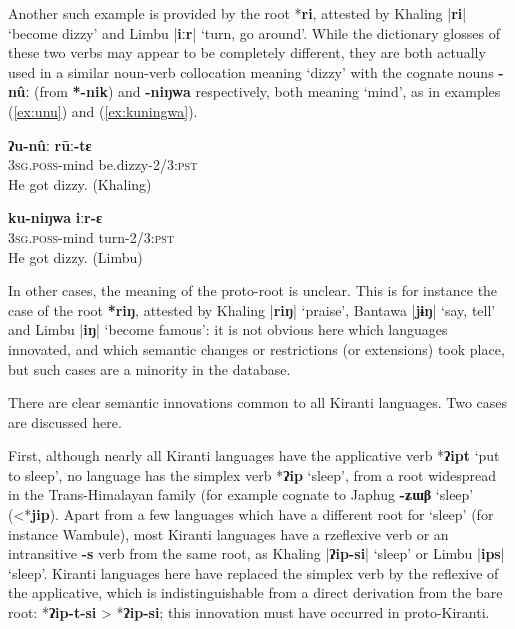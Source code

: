 \documentclass[oneside,a4paper,11pt]{article}
\newcommand{\ipa}[1]{\textbf{{\phon\mbox{#1}}}} %
\newcommand{\dhatu}[2]{|\ipa{#1}| `#2'}
\begin{document}
Another such example is provided by the root *\ipa{ri}, attested by Khaling \dhatu{ri}{become dizzy} and Limbu \dhatu{iːr}{turn, go around}. While the dictionary glosses of these two verbs may appear to be completely different, they are both actually used in a similar noun-verb collocation meaning `dizzy' with the cognate nouns \ipa{-nûː} (from \ipa{*-nik}) and \ipa{-niŋwa} respectively, both meaning `mind', as in examples (\ref{ex:unu}) and (\ref{ex:kuningwa}).

\begin{exe}
\ex \label{ex:unu}
\gll \ipa{ʔu-nûː} \ipa{rūː-tɛ} \\
\textsc{3sg.poss}-mind be.dizzy-\textsc{2/3:pst} \\
\glt He got dizzy. (Khaling)
\end{exe}


\begin{exe}
\ex \label{ex:kuningwa}
\gll \ipa{ku-niŋwa} \ipa{iːr-ɛ} \\
\textsc{3sg.poss}-mind turn-\textsc{2/3:pst} \\
\glt He got dizzy. (Limbu)
\end{exe}



In other cases, the meaning of the proto-root is unclear. This is for instance the case of the root \ipa{*riŋ}, attested by Khaling \dhatu{riŋ}{praise}, Bantawa \dhatu{jɨŋ}{say, tell} and Limbu \dhatu{iŋ}{become famous}: it is not obvious here which languages innovated, and which semantic changes or restrictions (or extensions) took place, but such cases are a minority in the database.

There are clear semantic innovations common to all Kiranti languages. Two cases are discussed here.

First, although nearly all Kiranti languages have the applicative verb *\ipa{ʔipt} `put to sleep', no language has the simplex verb *\ipa{ʔip} `sleep', from a root widespread in the Trans-Himalayan family (for example cognate to Japhug \ipa{-ʑɯβ} `sleep' (<*\ipa{jip}). Apart from a few languages which have a different root for `sleep' (for instance Wambule), most Kiranti languages have a rzeflexive verb or an intransitive \ipa{-s} verb from the same root, as Khaling \dhatu{ʔip-si}{sleep} or Limbu \dhatu{ips}{sleep}. Kiranti languages here have replaced the simplex verb by the reflexive of the applicative, which is indistinguishable from a direct derivation from the bare root: *\ipa{ʔip-t-si} > *\ipa{ʔip-si}; this innovation must have occurred in proto-Kiranti.
\end{document}
